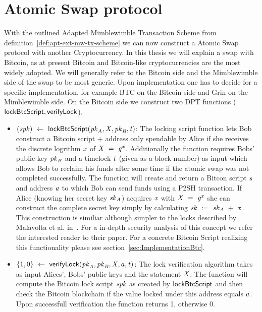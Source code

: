 \section{Atomic Swap protocol}\label{sec:atomic-swap}

With the outlined Adapted Mimblewimble Transaction Scheme from definition~\ref{def:apt-ext-mw-tx-scheme} we can now construct a Atomic Swap protocol with another Cryptocurrency.
In this thesis we will explain a swap with Bitcoin, as at present Bitcoin and Bitcoin-like cryptocurrencies are the
most widely adopted. We will generally refer to the Bitcoin side and the Mimblewimble side of the swap to be most generic.
Upon implementation one has to decide for a specific implementation, for example BTC on the Bitcoin side and Grin on
the Mimblewimble side.
On the Bitcoin side we construct two DPT functions ($\mathsf{lockBtcScript}, \mathsf{verifyLock}$).
\begin{itemize}
    \item $(\mathit{spk}) ~\leftarrow~ \mathsf{lockBtcScript} (\mathit{pk}_{\mathit{A}},\mathit{X},\mathit{pk}_{\mathit{B}},\mathit{t})$:
    The locking script function lets Bob construct a Bitcoin script + address only spendable by Alice if she receives the discrete logrithm
    $\mathit{x}$ of $\mathit{X} ~=~ \mathit{g}^{\mathit{x}}$.
    Additionally the function requires Bobs' public key $\mathit{pk}_{\mathit{B}}$ and a timelock $\mathit{t}$ (given as a block
    number) as input which allows Bob to reclaim his funds after some time if the atomic swap was not
    completed successfully. The function will create and return a Bitcon script $\mathit{s}$ and address $\mathit{a}$ to which Bob can send funds using a P2SH transaction.
    If Alice (knowing her secret key $\mathit{sk}_{\mathit{A}}$) acquires $\mathit{x}$ with $\mathit{X} ~=~ \mathit{g}^{\mathit{x}}$ she can construct the complete secret key simply
    by calculating $\mathit{sk} ~:=~ \mathit{sk}_{\mathit{A}} ~+~ \mathit{x}$. This construction is similiar although simpler to the locks described
    by Malavolta et al. in~\cite{malavolta2019anonymous}. For a in-depth security analysis of this concept we refer the interested reader to their paper. For
    a concrete Bitcoin Script realizing this functionality please see section~\ref{sec:ImplementationBtc}.
    \item $\{ 1,0 \} ~\leftarrow~ \mathsf{verifyLock} (\mathit{pk}_{\mathit{A}},\mathit{pk}_{\mathit{B}},\mathit{X},a,\mathit{t})$: 
    The lock verification algorithm takes as input Alices',
    Bobs' public keys and the statement $\mathit{X}$. The function will compute the Bitcoin lock script 
    $\mathit{spk}$ as created by $\mathsf{lockBtcScript}$ and then check the Bitcoin blockchain if the value locked 
    under this address equals $a$. 
    Upon successfull verification the function returns 1, otherwise 0.
\end{itemize}

